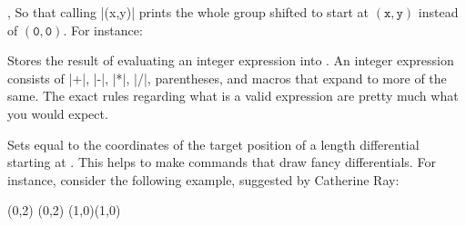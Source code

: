 \begin{sseqdata}[|| name = ex1, cohomological Serre grading]
\begin{commandlist}{\NewSseqGroup{},
                    \DeclareSseqGroup{}}
So that calling |\mygroup(x,y)| prints the whole group shifted to start at $\mathtt{(x,y)}$ instead of $\mathtt{(0,0)}$. For instance:
\end{commandlist}

\begin{command}{\sseqparseint{}}
Stores the result of evaluating an integer expression into . An integer expression consists of |+|, |-|, |*|, |/|, parentheses, and macros that expand to more of the same. The exact rules regarding what is a valid expression are pretty much what you would expect.
\end{command}

\begin{command}{\getdtarget{}\pars{\sourcecoord}}
Sets  equal to the coordinates of the target position of a length  differential starting at \sourcecoord. This helps to make commands that draw fancy differentials. For instance, consider the following example, suggested by Catherine Ray:
\begin{codeexample}[]
\begin{sseqdata}[ name = cathex, Adams grading, differentials = { blue } ]
\class(0,2)
\class(0,2)
\class(1,0)\class(1,0)


\end{sseqdata}
\end{codeexample}
\end{command}
\end{sseqdata}
